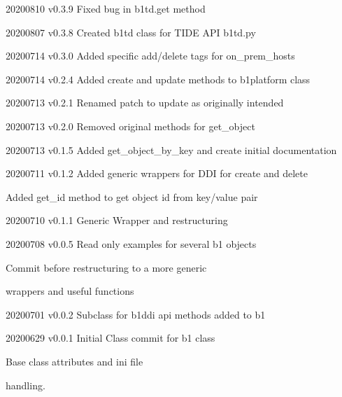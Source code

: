 \documentclass[letterpaper,10pt,english]{sphinxmanual}
\begin{document}
\begin{DUlineblock}{0em}
\item[] 20200810    v0.3.9  Fixed bug in b1td.get method
\item[] 20200807    v0.3.8  Created b1td class for TIDE API b1td.py
\item[] 20200714    v0.3.0  Added specific add/delete tags for on\_prem\_hosts
\item[] 20200714    v0.2.4  Added create and update methods to b1platform class
\item[] 20200713    v0.2.1  Renamed patch to update as originally intended
\item[] 20200713    v0.2.0  Removed original methods for get\_object
\item[] 20200713    v0.1.5  Added get\_object\_by\_key and create initial documentation
\item[] 20200711    v0.1.2  Added generic wrappers for DDI for create and delete
\item[]
\begin{DUlineblock}{\DUlineblockindent}
\item[] Added get\_id method to get object id from key/value pair
\end{DUlineblock}
\item[] 20200710    v0.1.1  Generic Wrapper and restructuring
\item[] 20200708    v0.0.5  Read only examples for several b1 objects
\item[]
\begin{DUlineblock}{\DUlineblockindent}
\item[]
\begin{DUlineblock}{\DUlineblockindent}
\item[] Commit before restructuring to a more generic
\end{DUlineblock}
\item[] wrappers and useful functions
\end{DUlineblock}
\item[] 20200701    v0.0.2  Subclass for b1ddi api methods added to b1
\item[] 20200629    v0.0.1  Initial Class commit for b1 class
\item[]
\begin{DUlineblock}{\DUlineblockindent}
\item[] Base class attributes and ini file
\item[] handling.
\end{DUlineblock}
\end{DUlineblock}
\end{document}
